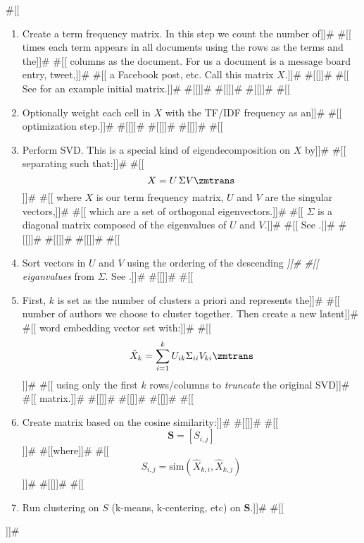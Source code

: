 \documentclass[12pt]{article}
\begin{document}
#[[\begin{enumerate}]]#
#[[\item Create a term frequency matrix.  In this step we count the number of]]#
#[[  times each term appears in all documents using the rows as the terms and the]]#
#[[  columns as the document.  For us a document is a message board entry, tweet,]]#
#[[  a Facebook post, etc.  Call this matrix $X$.]]#
#[[]]#
#[[  See  for an example initial matrix.]]#
#[[]]#
#[[]]#
#[[]]#
#[[\item Optionally weight each cell in $X$ with the TF/IDF frequency as an]]#
#[[  optimization step.]]#
#[[]]#
#[[]]#
#[[]]#
#[[\item Perform SVD.  This is a special kind of eigendecomposition on $X$ by]]#
#[[  separating such that:]]#
#[[\[X = U \, \Sigma V\zmtrans\]]]#
#[[  where $X$ is our term frequency matrix, $U$ and $V$ are the singular vectors,]]#
#[[  which are a set of orthogonal eigenvectors.]]#
#[[  $\Sigma$ is a diagonal matrix composed of the eigenvalues of $U$ and $V$.]]#
#[[  See .]]#
#[[]]#
#[[]]#
#[[]]#
#[[\item Sort vectors in $U$ and $V$ using the ordering of the descending {\it]]#
#[[    eiganvalues} from $\Sigma$.  See .]]#
#[[]]#
#[[\item First, $k$ is set as the number of clusters a priori and represents the]]#
#[[  number of authors we choose to cluster together.  Then create a new latent]]#
#[[  word embedding vector set with:]]#
#[[  \[\hat{X}_k = \sum_{i=1}^{k} U_{ik} \Sigma_{ii} V_{ki}\zmtrans\]]]#
#[[  using only the first $k$ rows/columns to {\it truncate} the original SVD]]#
#[[  matrix.]]#
#[[]]#
#[[]]#
#[[]]#
#[[\item Create matrix based on the cosine similarity:]]#
#[[]]#
#[[\[ \mathbf{S} = [S_{i,j}] \]]]#
#[[where]]#
#[[\[S_{i,j} = \textrm{sim}(\hat{X}_{k,i}, \hat{X}_{k,j})\]]]#
#[[]]#
#[[\item Run clustering on $S$ (k-means, k-centering, etc) on $\mathbf{S}$.]]#
#[[\end{enumerate}]]#



\medskip
\printbibliography%

\printacronyms[include-classes=abbrev, name=Abbreviations]%

\printacronyms[include-classes=def, name=Definitions]%

\end{document}
